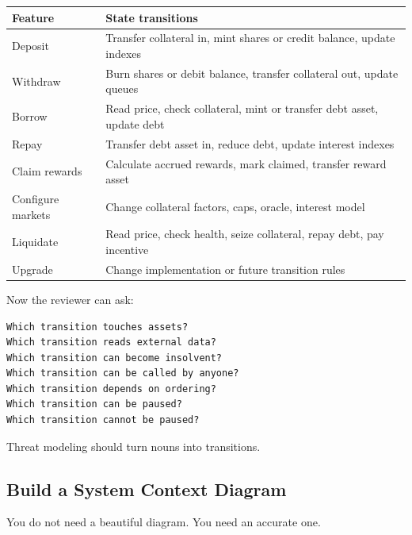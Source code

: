 {\def\LTcaptype{none} %
\begin{longtable}[]{@{}
  >{\raggedright\arraybackslash}p{}
  >{\raggedright\arraybackslash}p{}@{}}
\toprule\noalign{}
\begin{minipage}[b]{\linewidth}\raggedright
Feature
\end{minipage} & \begin{minipage}[b]{\linewidth}\raggedright
State transitions
\end{minipage} \\
\midrule\noalign{}
\endhead
\bottomrule\noalign{}
\endlastfoot
Deposit & Transfer collateral in, mint shares or credit balance, update
indexes \\
Withdraw & Burn shares or debit balance, transfer collateral out, update
queues \\
Borrow & Read price, check collateral, mint or transfer debt asset,
update debt \\
Repay & Transfer debt asset in, reduce debt, update interest indexes \\
Claim rewards & Calculate accrued rewards, mark claimed, transfer reward
asset \\
Configure markets & Change collateral factors, caps, oracle, interest
model \\
Liquidate & Read price, check health, seize collateral, repay debt, pay
incentive \\
Upgrade & Change implementation or future transition rules \\
\end{longtable}
}

Now the reviewer can ask:

\begin{lstlisting}
Which transition touches assets?
Which transition reads external data?
Which transition can become insolvent?
Which transition can be called by anyone?
Which transition depends on ordering?
Which transition can be paused?
Which transition cannot be paused?
\end{lstlisting}

Threat modeling should turn nouns into transitions.

\subsection{Build a System Context Diagram}

You do not need a beautiful diagram. You need an accurate one.

